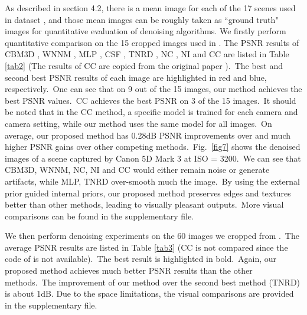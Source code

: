 \documentclass[10pt,twocolumn,letterpaper]{article}
\begin{document}
As described in section 4.2, there is a mean image for each of the 17 scenes used in dataset \cite{crosschannel2016}, and those mean images can be roughly taken as ``ground truth" images for quantitative evaluation of denoising algorithms. We firstly perform quantitative comparison on the 15 cropped images used in \cite{crosschannel2016}. The PSNR results of CBM3D \cite{bm3d}, WNNM \cite{wnnm}, MLP \cite{mlp}, CSF \cite{csf}, TNRD \cite{chen2015learning}, NC \cite{noiseclinic,ncwebsite}, NI \cite{neatimage} and
CC \cite{crosschannel2016} are listed in Table \ref{tab2} (The results of CC are copied from the original paper \cite{crosschannel2016}).\ The best and second best PSNR results of each image are highlighted in red and blue, respectively.\ One can see that on 9 out of the 15 images, our method achieves the best PSNR values.\ CC achieves the best PSNR on 3 of the 15 images.\ It should be noted that in the CC method, a specific model is trained for each camera and camera setting, while our method uses the same model for all images.\ On average, our proposed method has 0.28dB PSNR improvements over \cite{crosschannel2016} and much higher PSNR gains over other competing methods.\ Fig.\ \ref{fig7} shows the denoised images of a scene captured by Canon 5D Mark 3 at ISO = 3200.\ We can see that CBM3D, WNNM, NC, NI and CC would either remain noise or generate artifacts, while MLP, TNRD over-smooth much the image.\ By using the external prior guided internal priors, our proposed method preserves edges and textures better than other methods, leading to visually pleasant outputs.\ More visual comparisons can be found in the supplementary file.

We then perform denoising experiments on the 60 images we cropped from \cite{crosschannel2016}.\ The average PSNR results are listed in Table \ref{tab3} (CC is not compared since the code of \cite{crosschannel2016} is not available).\ The best result is highlighted in bold.\ Again, our proposed method achieves much better PSNR results than the other methods.\ The improvement of our method over the second best method (TNRD) is about 1dB. Due to the space limitations, the visual comparisons are provided in the supplementary file.
\end{document}
